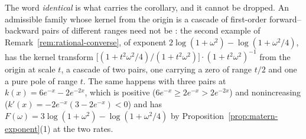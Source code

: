 The word \emph{identical} is what carries the corollary, and it cannot be dropped. An admissible
family whose kernel from the origin is a cascade of first-order forward--backward pairs of
different ranges need not be \Matern{}: the second example of
Remark~\ref{rem:rational-converse}, of exponent $2\log(1+\omega^2) - \log(1+\omega^2/4)$, has the
kernel transform $\bigl[(1+t^2\omega^2/4)/(1+t^2\omega^2)\bigr]\cdot(1+t^2\omega^2)^{-1}$ from the
origin at scale $t$, a cascade of two pairs, one carrying a zero of range $t/2$ and one a pure
pole of range $t$. The same happens with three pairs at $k(x) = 6e^{-x} - 2e^{-2x}$, which is
positive ($6e^{-x} \ge 2e^{-x} > 2e^{-2x}$) and nonincreasing
($k'(x) = -2e^{-x}(3-2e^{-x}) < 0$) and has
$F(\omega) = 3\log(1+\omega^2) - \log(1+\omega^2/4)$ by
Proposition~\ref{prop:matern-exponent}(1) at the two rates.

